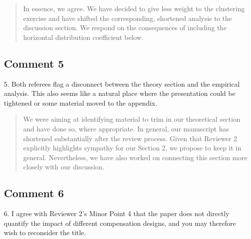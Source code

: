 \documentclass[11pt]{article}
\newenvironment{response}
{\begin{quote}\color{black}}
{\end{quote}}
\begin{document}
\begin{response}
    In essence, we agree. We have decided to give less weight to the clustering exercise and have shifted the corresponding, shortened analysis to the discussion section. We respond on the consequences of including the horizontal distribution coefficient below.
\end{response}

\subsection*{Comment 5}\label{comment_E_5}
\begin{commentbox}
    5. Both referees flag a disconnect between the theory section and the empirical analysis. This also seems like a natural place where the presentation could be tightened or some material moved to the appendix.
\end{commentbox}

\begin{response}
    We were aiming at identifying material to trim in our theoretical section and have done so, where appropriate. In general, our manuscript has shortened substantially after the review process. Given that Reviewer 2 explicitly highlights sympathy for our Section 2, we propose to keep it in general. Nevertheless, we have also worked on connecting this section more closely with our discussion. 
\end{response}

\subsection*{Comment 6}\label{comment_E_6}
\begin{commentbox}
    6. I agree with Reviewer 2’s Minor Point 4 that the paper does not directly quantify the impact of different compensation designs, and you may therefore wish to reconsider the title.
\end{commentbox}
\end{document}
